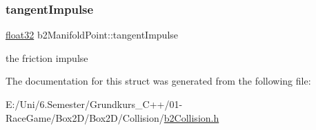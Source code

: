 \subsubsection{\texorpdfstring{tangentImpulse}{tangentImpulse}}
{\footnotesize\ttfamily \mbox{\hyperlink{b2_settings_8h_aacdc525d6f7bddb3ae95d5c311bd06a1}{float32}} b2\+Manifold\+Point\+::tangent\+Impulse}



the friction impulse 



The documentation for this struct was generated from the following file\+:\begin{DoxyCompactItemize}
\item 
E\+:/\+Uni/6.\+Semester/\+Grundkurs\+\_\+\+C++/01-\/\+Race\+Game/\+Box2\+D/\+Box2\+D/\+Collision/\mbox{\hyperlink{b2_collision_8h}{b2\+Collision.\+h}}\end{DoxyCompactItemize}
